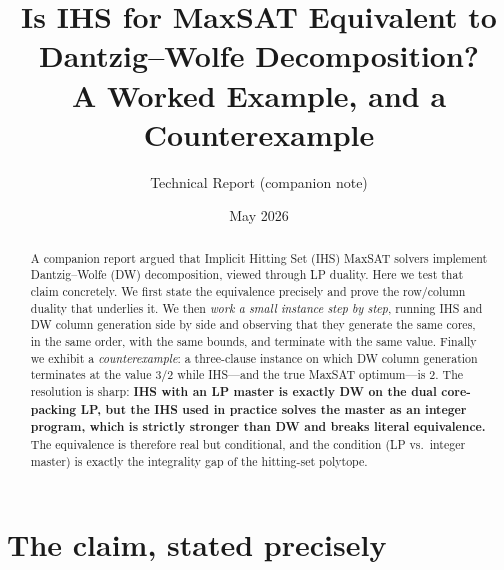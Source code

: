 \documentclass[11pt,a4paper]{article}
\title{Is IHS for MaxSAT Equivalent to Dantzig--Wolfe Decomposition?\\
       A Worked Example, and a Counterexample}
\author{Technical Report (companion note)}
\date{May 2026}
\begin{document}
\maketitle

\begin{abstract}
A companion report argued that Implicit Hitting Set (IHS) MaxSAT solvers
implement Dantzig--Wolfe (DW) decomposition, viewed through LP duality. Here we
test that claim concretely. We first state the equivalence precisely and prove
the row/column duality that underlies it. We then \emph{work a small instance
step by step}, running IHS and DW column generation side by side and observing
that they generate the same cores, in the same order, with the same bounds, and
terminate with the same value. Finally we exhibit a \emph{counterexample}: a
three-clause instance on which DW column generation terminates at the value
$3/2$ while IHS---and the true MaxSAT optimum---is $2$. The resolution is sharp:
\textbf{IHS with an LP master is exactly DW on the dual core-packing LP, but the
IHS used in practice solves the master as an integer program, which is strictly
stronger than DW and breaks literal equivalence.} The equivalence is therefore
real but conditional, and the condition (LP vs.\ integer master) is exactly the
integrality gap of the hitting-set polytope.
\end{abstract}

\section{The claim, stated precisely}
\label{sec:claim}
\end{document}
